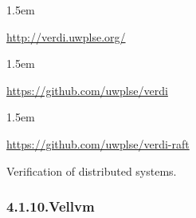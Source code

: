 \documentclass[12pt,twoside]{article}
\begin{document}
\begin{mddefinitions}%


\begin{mdbmarginx}{}{}{}{1.5em}%
\begin{mddefdata}%
\href{http://verdi.uwplse.org/}{{\ttfamily http://\hspace{0pt}verdi.\hspace{0pt}uwplse.\hspace{0pt}org/\hspace{0pt}}}
\end{mddefdata}%
\end{mdbmarginx}%


\begin{mdbmarginx}{}{}{}{1.5em}%
\begin{mddefdata}%
\href{https://github.com/uwplse/verdi}{{\ttfamily https://\hspace{0pt}github.\hspace{0pt}com/\hspace{0pt}uwplse/\hspace{0pt}verdi}}
\end{mddefdata}%
\end{mdbmarginx}%


\begin{mdbmarginx}{}{}{}{1.5em}%
\begin{mddefdata}%
\href{https://github.com/uwplse/verdi-raft}{{\ttfamily https://\hspace{0pt}github.\hspace{0pt}com/\hspace{0pt}uwplse/\hspace{0pt}verdi-\hspace{0pt}raft}}%
\end{mddefdata}%
\end{mdbmarginx}%
\end{mddefinitions}%

\noindent{}Verification of distributed systems.%

\subsubsection{4.1.10.\hspace*{0.5em}Vellvm}%
\end{document}
